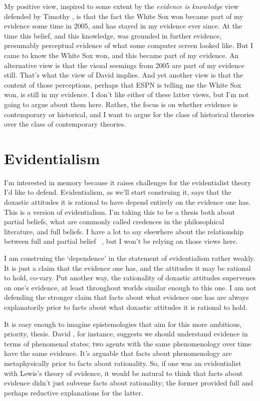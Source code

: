 My positive view, inspired to some extent by the \emph{evidence is knowledge} view defended by Timothy  \citet{Williamson2000}, is that the fact the White Sox won became part of my evidence some time in 2005, and has stayed in my evidence ever since. At the time this belief, and this knowledge, was grounded in further evidence, presumably perceptual evidence of what some computer screen looked like. But I came to know the White Sox won, and this became part of my evidence. An alternative view is that the visual seemings from 2005 are part of my evidence still. That's what the view of David  \citet{Lewis1996b} implies. And yet another view is that the content of those perceptions, perhaps that ESPN is telling me the White Sox won, is still in my evidence. I don't like either of these latter views, but I'm not going to argue about them here. Rather, the focus is on whether evidence is contemporary or historical, and I want to argue for the class of historical theories over the class of contemporary theories.

\section{Evidentialism}
\label{evidentialism}

I'm interested in memory because it raises challenges for the evidentialist theory I'd like to defend. Evidentialism, as we'll start construing it, says that the doxastic attitudes it is rational to have depend entirely on the evidence one has. This is a version of evidentialism. I'm taking this to be a thesis both about partial beliefs, what are commonly called credences in the philosophical literature, and full beliefs. I have a lot to say elsewhere about the relationship between full and partial belief ~\citep{Weatherson2012}, but I won't be relying on those views here. 

I am construing the `dependence' in the statement of evidentialism rather weakly. It is just a claim that the evidence one has, and the attitudes it may be rational to hold, co-vary. Put another way, the rationality of doxastic attitudes supervenes on one's evidence, at least throughout worlds similar enough to this one. I am not defending the stronger claim that facts about what evidence one has are always explanatorily prior to facts about what doxastic attitudes it is rational to hold.

It is easy enough to imagine epistemologies that aim for this more ambitious, priority, thesis. David  \citet{Lewis1996b}, for instance, suggests we should understand evidence in terms of phenomenal states; two agents with the same phenomenology over time have the same evidence. It's arguable that facts about phenomenology are metaphysically prior to facts about rationality. So, if one was an evidentialist with Lewis's theory of evidence, it would be natural to think that facts about evidence didn't just subvene facts about rationality; the former provided full and perhaps reductive explanations for the latter.

